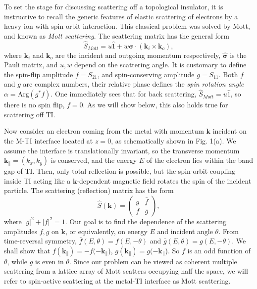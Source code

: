 \documentclass[11pt]{report}
\def\v#1{\mathbf{#1}}
\begin{document}
To set the stage for discussing scattering off a topological insulator, it is instructive to recall the generic features of elastic scattering of electrons by a heavy ion with spin-orbit interaction. This classical problem was solved by Mott, and known as {\it Mott scattering}. 
The scattering matrix has the general form \cite{mott}
\[
\hat{S}_{Mott}=u\hat{1}+w\hat{\boldsymbol{\sigma}}\cdot (\mathbf{k}_{i}\times \mathbf{k}_{o}),
\]
where $\mathbf{k}_{i}$ and $\mathbf{k}_{o}$ are the incident and outgoing momentum respectively, $\hat{\boldsymbol{\sigma}}$ is the Pauli matrix, and $u,w$ depend on the scattering angle. It is customary to
define the spin-flip amplitude $f=S_{21}$, and spin-conserving amplitude $g=S_{11}$. 
Both $f$ and $g$ are complex numbers, their relative phase defines the {\it spin rotation angle} $\alpha=\mathrm{Arg}(g^*f)$.
One immediately sees that for back scattering, $\hat{S}_{Mott}=u\hat{1}$, so there is no spin flip, $f=0$. As we will show below, this also holds true for scattering off TI.

Now consider an electron coming from the metal 
with momentum $\v{k}$ incident on the M-TI interface located at $z=0$, 
as schematically shown in Fig. 1(a). 
We assume the interface is 
translationally invariant, so the transverse momentum $\v{k}_{\parallel}=(k_x,k_y)$ is 
conserved, and the energy $E$ of the electron 
lies within the band gap of TI. Then, only total reflection 
is possible, but the spin-orbit coupling inside TI acting like a $\v{k}$-dependent magnetic field rotates the spin of the incident particle. The scattering (reflection) matrix has the form
\[
\hat{S}(\v{k})=\left(
\begin{array}{ll}
  g & \bar{f}   \\
  f & \bar{g}
  \end{array}
\right),
\]
where $|g|^2+|f|^2=1$. 
Our goal is to find the dependence of the scattering amplitudes $f,g$ 
on $\v{k}$, or equivalently, on energy $E$ and 
incident angle $\theta$. From time-reversal symmetry, 
$\bar{f}(E,\theta)=f(E,-\theta)$ and $\bar{g}(E,\theta)=g(E,-\theta)$.
We shall show that
$f(\v{k}_{\parallel})=-f(-\v{k}_{\parallel}$),
$g(\v{k}_{\parallel})=g(-\v{k}_{\parallel}$). So 
$f$ is an odd function of $\theta$, while $g$ is even in $\theta$.  
Since our problem can be viewed as coherent multiple scattering from a lattice 
array of Mott scatters occupying half the space, we will refer to
spin-active scattering at the metal-TI interface as Mott scattering.
\end{document}
